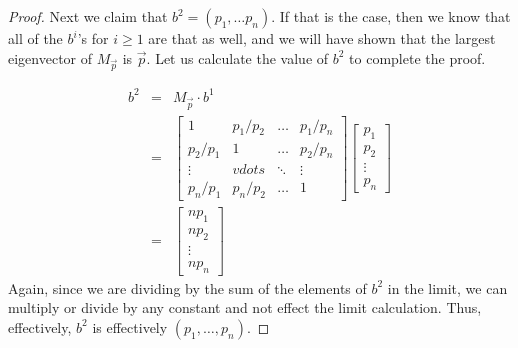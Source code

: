 \documentclass[10pt,twoside]{article}
\begin{document}
\begin{proof}
Next we claim that $b^2 = (p_1, \ldots p_n)$.  If that is the case, then we know
that all of the $b^i$'s for $i\geq 1$ are that as well, and we will have shown that
the largest eigenvector of $M_{\vec{p}}$ is $\vec{p}$.  Let us calculate the value
of $b^2$ to complete the proof.

\begin{eqnarray*}
b^2 &=& M_{\vec{p}} \cdot b^1 \\
&=& 	
	\begin{bmatrix}
	1 & p_1/p_2 & \ldots & p_1/p_n\\
	p_2/p_1 & 1 & \ldots & p_2/p_n \\
	\vdots & vdots & \ddots & \vdots \\
	p_n/p_1 & p_n/p_2 & \ldots & 1	
	\end{bmatrix}
	\begin{bmatrix}
	p_1 \\
	p_2 \\
	\vdots \\
	p_n
	\end{bmatrix} \\
	&=&
	\begin{bmatrix}
	n p_1 \\
	n p_2 \\
	\vdots \\
	n p_n	
	\end{bmatrix}
\end{eqnarray*}
Again, since we are dividing by the sum of the elements of $b^2$ in the limit, we
can multiply or divide by any constant and not effect the limit calculation.  Thus, effectively, $b^2$ is effectively $(p_1, \ldots, p_n)$.
\end{proof}
\end{document}

